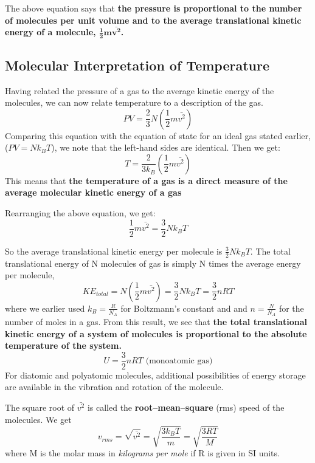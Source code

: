 The above equation says that \textbf{the pressure is proportional to the number of molecules per unit volume and to the average translational kinetic energy of a molecule, $\mathbf{\frac{1}{2}m\bar{v^2}}$.}

\subsection{Molecular Interpretation of Temperature}
Having related the pressure of a gas to the average kinetic energy of the molecules, we can now relate temperature to a description of the gas.
$$PV = \frac{2}{3}N\left(\frac{1}{2}m\bar{v^2}\right)$$
Comparing this equation with the equation of state for an ideal gas stated earlier, ($PV = Nk_BT$), we note that the left-hand sides are identical. Then we get:
$$T = \frac{2}{3k_B}\left(\frac{1}{2}m\bar{v^2}\right)$$
This means that \textbf{the temperature of a gas is a direct measure of the average molecular kinetic energy of a gas}

Rearranging the above equation, we get:
$$\frac{1}{2}m\bar{v^2} = \frac{3}{2}Nk_BT$$

So the average translational kinetic energy per molecule is $\frac{3}{2}Nk_BT$. The total translational energy of N molecules of gas is simply N times the average energy per molecule,
$$KE_{total}=N\left(\frac{1}{2}m\bar{v^2}\right) = \frac{3}{2}Nk_BT = \frac{3}{2}nRT$$
where we earlier used $k_B=\frac{R}{N_A}$ for Boltzmann's constant and and $n=\frac{N}{N_A}$ for the number of moles in a gas. From this result, we see that \textbf{the total translational kinetic energy of a system of molecules is proportional to the absolute temperature of the system.}
$$U=\frac{3}{2}nRT \textrm{ (monoatomic gas)}$$
For diatomic and polyatomic molecules, additional possibilities of energy storage are available in the vibration and rotation of the molecule.

The square root of $\bar{v^2}$ is called the \textbf{root--mean--square} (rms) speed of the molecules. We get
$$v_{rms} = \sqrt{\bar{v^2}} = \sqrt{\frac{3k_BT}{m}} = \sqrt{\frac{3RT}{M}} $$
where M is the molar mass in \emph{kilograms per mole} if R is given in SI units.